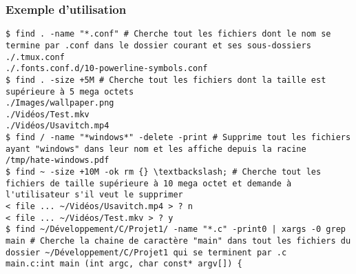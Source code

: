 \subsubsection*{Exemple d'utilisation}

\begin{lstlisting}
$ find . -name "*.conf" # Cherche tout les fichiers dont le nom se termine par .conf dans le dossier courant et ses sous-dossiers
./.tmux.conf
./.fonts.conf.d/10-powerline-symbols.conf
$ find . -size +5M # Cherche tout les fichiers dont la taille est supérieure à 5 mega octets
./Images/wallpaper.png
./Vidéos/Test.mkv
./Vidéos/Usavitch.mp4
$ find / -name "*windows*" -delete -print # Supprime tout les fichiers ayant "windows" dans leur nom et les affiche depuis la racine
/tmp/hate-windows.pdf
$ find ~ -size +10M -ok rm {} \textbackslash; # Cherche tout les fichiers de taille supérieure à 10 mega octet et demande à l'utilisateur s'il veut le supprimer
< file ... ~/Vidéos/Usavitch.mp4 > ? n
< file ... ~/Vidéos/Test.mkv > ? y
$ find ~/Développement/C/Projet1/ -name "*.c" -print0 | xargs -0 grep main # Cherche la chaine de caractère "main" dans tout les fichiers du dossier ~/Développement/C/Projet1 qui se terminent par .c
main.c:int main (int argc, char const* argv[]) {
\end{lstlisting}
